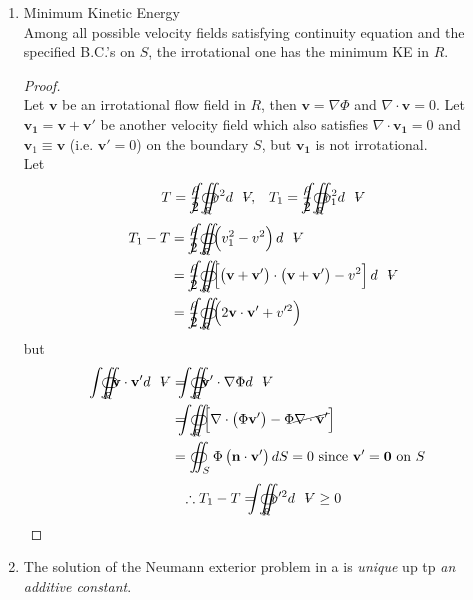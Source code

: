 \begin{enumerate}[label = (\arabic*)]
\item Minimum Kinetic Energy\\
Among all possible velocity fields satisfying continuity equation and the specified B.C.'s on $S$, the irrotational one has the minimum KE in $R$.
\begin{proof}\mbox{}\\
Let $\mathbf{v}$ be an irrotational flow field in $R$, then $\mathbf{v}=\nabla\Phi$ and $\nabla\cdot\mathbf{v} = 0$. Let $\mathbf{v_1} = \mathbf{v}+\mathbf{v'}$ be another velocity field which also satisfies $\nabla\cdot\mathbf{v_1} = 0$ and $\mathbf{v}_1\equiv\mathbf{v}$ (i.e. $\mathbf{v'}=0$) on the boundary $S$, but $\mathbf{v_1}$ is not irrotational.\\
Let
\begin{align*}
T = \frac{\rho}{2}{\oiint \hspace{-23.5pt} \int}_Rv^2d\volume, && T_1 = \frac{\rho}{2}{\oiint \hspace{-23.5pt} \int}_R v_1^2d\volume
\end{align*}
\begin{align*}
T_1 - T
&= \frac{\rho}{2}{\oiint \hspace{-23.5pt} \int}_R\left(v_1^2-v^2\right)d\volume \\ 
&= \frac{\rho}{2}{\oiint \hspace{-23.5pt} \int}_R\left[\left(\mathbf{v}+\mathbf{v'}\right)\cdot\left(\mathbf{v}+\mathbf{v'}\right) - v^2\right]d\volume \\
&= \frac{\rho}{2}{\oiint \hspace{-23.5pt} \int}_R\left(2\mathbf{v}\cdot\mathbf{v'}+v'^2\right)
\end{align*}
but 
\begin{align*}
{\oiint \hspace{-23.5pt} \int}_R\mathbf{v}\cdot\mathbf{v'}d\volume
&= {\oiint \hspace{-23.5pt} \int}_R\mathbf{v'}\cdot\nabla\Phi d\volume \\ 
&= {\oiint \hspace{-23.5pt} \int}_R\left[\nabla\cdot\left(\Phi\mathbf{v'}\right) - \Phi\cancel{\nabla\cdot\mathbf{v'}}\right] \\
&= \oiint_S\Phi\left(\mathbf{n}\cdot\mathbf{v'}\right)dS = 0\text{ since }\mathbf{v'} = \mathbf{0}\text{ on }S
\end{align*}
\[
\therefore T_1-T = {\oiint \hspace{-23.5pt} \int}_Rv'^2d\volume\geq 0
\]
\end{proof}
\item The solution of the Neumann exterior problem in a  is \emph{unique} up tp \emph{an additive constant}. \\

\end{enumerate}
